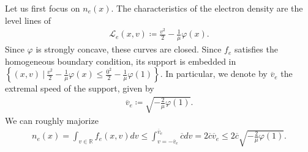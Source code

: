 \documentclass{article}
\numberwithin{equation}{section}
\newcommand{\ve}{{\overline{v}_e}} %
\newcommand{\maxfe}{{\overline{c}}} %
\begin{document}
Let us first focus on $n_e(x)$. The characteristics of the electron density are the level lines of
\begin{align}\label{eq:def_Le}
	\mathcal{L}_e(x,v) \coloneqq \frac{v^2}{2} - \frac{1}{\mu} \varphi(x).
\end{align}
Since $\varphi$ is strongly concave, these curves are closed. Since $f_e$ satisfies the homogeneous boundary condition, its support is embedded in $\left\{(x,v) \ |\ \frac{v^2}{2} - \frac{1}{\mu} \varphi(x) \leqslant \frac{0^2}{2} - \frac{1}{\mu} \varphi(1)\right\}$. In particular, we denote by $\ve$ the extremal speed of the support, given by
\begin{align}\label{eq:def_ve}
	\ve \coloneqq \sqrt{-\frac{2}{\mu} \varphi(1)}.
\end{align}
We can roughly majorize
\begin{align*}
	n_e(x) = \int_{v\in\mathbb{R}} f_e(x,v) dv \leqslant \int_{v=-\ve}^{\ve} \maxfe dv = 2 \maxfe \ve \leqslant 2 \maxfe \sqrt{-\frac{2}{\mu} \varphi(1)}.
\end{align*}
\end{document}
